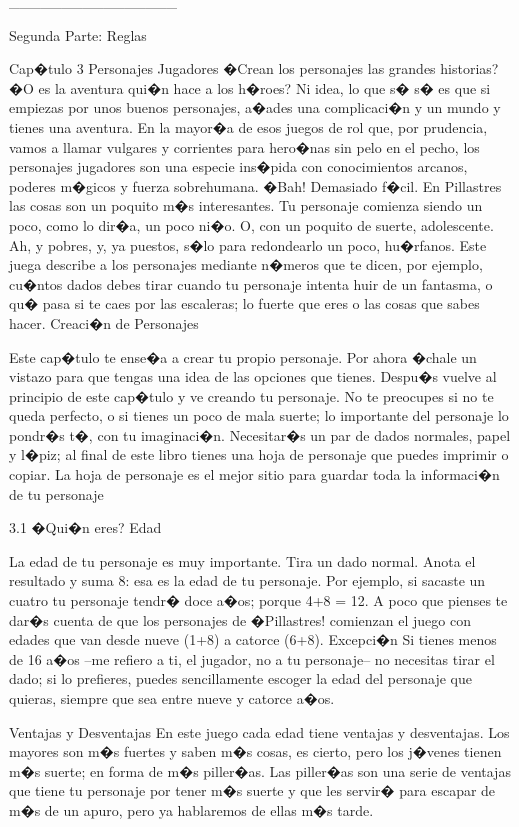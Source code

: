 ________________


Segunda Parte: Reglas


Cap�tulo 3 Personajes Jugadores
�Crean los personajes las grandes historias? �O es la aventura qui�n hace a los h�roes? Ni idea, lo que s� s� es que si empiezas por unos buenos personajes, a�ades una complicaci�n y un mundo y tienes una aventura. 
En la mayor�a de esos juegos de rol que, por prudencia, vamos a llamar vulgares y corrientes para hero�nas sin pelo en el pecho, los personajes jugadores son una especie ins�pida con conocimientos arcanos, poderes m�gicos y fuerza sobrehumana. �Bah! Demasiado f�cil. En Pillastres las cosas son un poquito m�s interesantes.
Tu personaje comienza siendo un poco, como lo dir�a, un poco ni�o. O, con un poquito de suerte, adolescente. Ah, y pobres, y, ya puestos, s�lo para redondearlo un poco, hu�rfanos.
Este juega describe a los personajes mediante n�meros que te dicen, por ejemplo, cu�ntos dados debes tirar cuando tu personaje intenta huir de un fantasma, o qu� pasa si te caes por las escaleras; lo fuerte que eres o las cosas que sabes hacer.
Creaci�n de Personajes


Este cap�tulo te ense�a a crear tu propio personaje. Por ahora �chale un vistazo para que tengas una idea de las opciones que tienes. Despu�s vuelve al principio de este cap�tulo y ve creando tu personaje. No te preocupes si no te queda perfecto, o si tienes un poco de mala suerte; lo importante del personaje lo pondr�s t�, con tu imaginaci�n.
Necesitar�s un par de dados normales, papel y l�piz; al final de este libro tienes una hoja de personaje que puedes imprimir o copiar. La hoja de personaje es el mejor sitio para guardar toda la informaci�n de tu personaje 


3.1 �Qui�n eres?
Edad


La edad de tu personaje es muy importante. Tira un dado normal. Anota el resultado y suma 8: esa es la edad de tu personaje. Por ejemplo, si sacaste un cuatro tu personaje tendr� doce a�os; porque 4+8 = 12. A poco que pienses te dar�s cuenta de que los personajes de �Pillastres! comienzan el juego con edades que van desde nueve (1+8) a catorce (6+8).
Excepci�n
Si tienes menos de 16 a�os --me refiero a ti, el jugador, no a tu personaje-- no necesitas tirar el dado; si lo prefieres, puedes sencillamente escoger la edad del personaje que quieras, siempre que sea entre nueve y catorce a�os.


Ventajas y Desventajas
En este juego cada edad tiene ventajas y desventajas. Los mayores son m�s fuertes y saben m�s cosas, es cierto, pero los j�venes tienen m�s suerte; en forma de m�s piller�as. Las piller�as son una serie de ventajas que tiene tu personaje por tener m�s suerte y que les servir� para escapar de m�s de un apuro, pero ya hablaremos de ellas m�s tarde.


